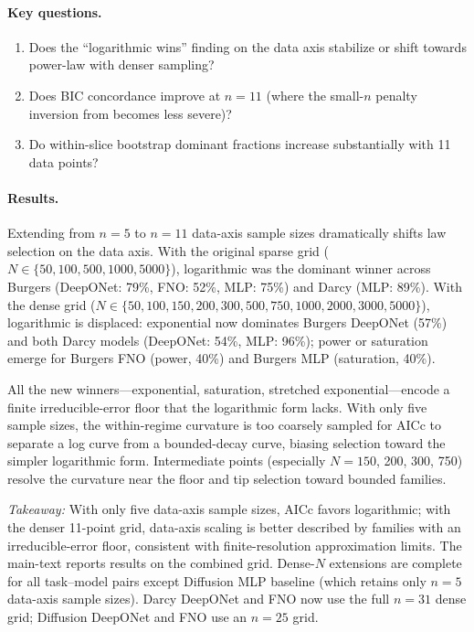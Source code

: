 \documentclass[11pt]{article}
\begin{document}
\paragraph{Key questions.}
\begin{enumerate}
  \item Does the ``logarithmic wins'' finding on the data axis
    stabilize or shift towards power-law with denser sampling?
  \item Does BIC concordance improve at $n = 11$ (where the small-$n$
    penalty inversion from  becomes less severe)?
  \item Do within-slice bootstrap dominant fractions increase
    substantially with 11 data points?
\end{enumerate}

\paragraph{Results.}
Extending from $n = 5$ to $n = 11$ data-axis sample sizes
dramatically shifts law selection on the data axis.
With the original sparse grid ($N \in \{50, 100, 500, 1000, 5000\}$),
logarithmic was the dominant winner across Burgers
(DeepONet: 79\%, FNO: 52\%, MLP: 75\%) and Darcy (MLP: 89\%).
With the dense grid ($N \in \{50, 100, 150, 200, 300, 500, 750,
1000, 2000, 3000, 5000\}$), logarithmic is displaced: exponential
now dominates Burgers DeepONet (57\%) and both Darcy models
(DeepONet: 54\%, MLP: 96\%); power or saturation emerge for
Burgers FNO (power, 40\%) and Burgers MLP (saturation, 40\%).

All the new winners---exponential, saturation, stretched
exponential---encode a finite irreducible-error floor that the
logarithmic form lacks. With only five sample sizes, the
within-regime curvature is too coarsely sampled for AICc to separate
a log curve from a bounded-decay curve, biasing selection toward the
simpler logarithmic form. Intermediate points (especially $N = 150$,
200, 300, 750) resolve the curvature near the floor and tip
selection toward bounded families.

\emph{Takeaway:} With only five data-axis sample sizes, AICc
favors logarithmic; with the denser 11-point grid,
data-axis scaling is better described by families
with an irreducible-error floor, consistent with finite-resolution
approximation limits. The main-text  reports
results on the combined grid.
Dense-$N$ extensions are complete for all task--model pairs except
Diffusion MLP baseline (which retains only $n = 5$ data-axis
sample sizes). Darcy DeepONet and FNO now use the full $n = 31$
dense grid; Diffusion DeepONet and FNO use an $n = 25$ grid.
\end{document}
